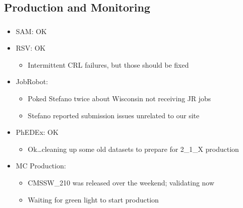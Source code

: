 \documentclass{beamer}
\begin{document}
\subsection{Production and Monitoring}
\begin{frame}
\frametitle{}
\begin{itemize}
    \item SAM: OK
    \item RSV: OK
    \begin{itemize}
        \item Intermittent CRL failures, but those should be fixed
    \end{itemize}
    \item JobRobot:
    \begin{itemize}
        \item Poked Stefano twice about Wisconsin not receiving JR jobs
        \item Stefano reported submission issues unrelated to our site
    \end{itemize}
    \item PhEDEx: OK
    \begin{itemize}
        \item Ok\ldots{}cleaning up some old datasets to prepare for 2\_1\_X production
    \end{itemize}
    \item MC Production:
    \begin{itemize}
        \item CMSSW\_210 was released over the weekend; validating now
        \item Waiting for green light to start production
    \end{itemize}
\end{itemize}
\end{frame}
\end{document}
